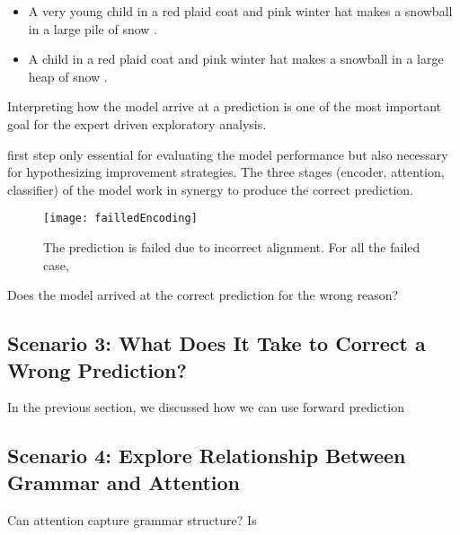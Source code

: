 \begin{itemize}
\item A very young child in a red plaid coat and pink winter hat makes a snowball in a large pile of snow .
\item A child in a red plaid coat and pink winter hat makes a snowball in a large heap of snow .
\end{itemize}

Interpreting how the model arrive at a prediction is one of the most important goal for the expert driven exploratory analysis.
%

 first step  only essential for evaluating the model performance but also necessary for hypothesizing improvement strategies.
%
The three stages (encoder, attention, classifier) of the model work in synergy to produce the correct prediction.

\begin{figure*}[t]
\centering
\vspace{-2mm}
 \texttt{[image: failledEncoding]}
 \caption{
The prediction is failed due to incorrect alignment. For all the failed case, 
 }
\label{fig:failedEncoding}
\end{figure*}


Does the model arrived at the correct prediction for the wrong reason?

\subsection{Scenario 3: What Does It Take to Correct a Wrong Prediction?}
In the previous section, we discussed how we can use forward prediction


\subsection{Scenario 4: Explore Relationship Between Grammar and Attention}
Can attention capture grammar structure? Is 

